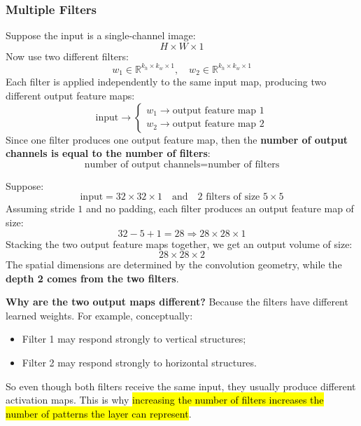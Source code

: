 \subsubsection{Multiple Filters}\label{sec:multiple-filters}

Suppose the input is a single-channel image:
\begin{equation*}
    H \times W \times 1
\end{equation*}
Now use two different filters:
\begin{equation*}
    w_1 \in \mathbb{R}^{k_h \times k_w \times 1}, \quad w_2 \in \mathbb{R}^{k_h \times k_w \times 1}
\end{equation*}
Each filter is applied independently to the same input map, producing two different output feature maps:
\begin{equation*}
    \text{input} \to \begin{cases}
        w_1 \to \text{output feature map 1} \\
        w_2 \to \text{output feature map 2}
    \end{cases}
\end{equation*}
Since one filter produces one output feature map, then the \textbf{number of output channels is equal to the number of filters}:
\begin{equation*}
    \text{number of output channels} = \text{number of filters}
\end{equation*}

\begin{examplebox}
    Suppose:
    \begin{equation*}
        \text{input} = 32 \times 32 \times 1 \quad \text{and} \quad 2 \text{ filters of size } 5 \times 5
    \end{equation*}
    Assuming stride $1$ and no padding, each filter produces an output feature map of size:
    \begin{equation*}
        32 - 5 + 1 = 28 \Rightarrow
        28 \times 28 \times 1
    \end{equation*}
    Stacking the two output feature maps together, we get an output volume of size:
    \begin{equation*}
        28 \times 28 \times 2
    \end{equation*}
    The spatial dimensions are determined by the convolution geometry, while the \textbf{depth 2 comes from the two filters}.

    \textcolor{Green3}{ \textbf{Why are the two output maps different?}} Because the filters have different learned weights. For example, conceptually:
    \begin{itemize}
        \item Filter 1 may respond strongly to vertical structures;
        \item Filter 2 may respond strongly to horizontal structures.
    \end{itemize}
    So even though both filters receive the same input, they usually produce different activation maps. This is why \hl{increasing the number of filters increases the number of patterns the layer can represent}.
\end{examplebox}


